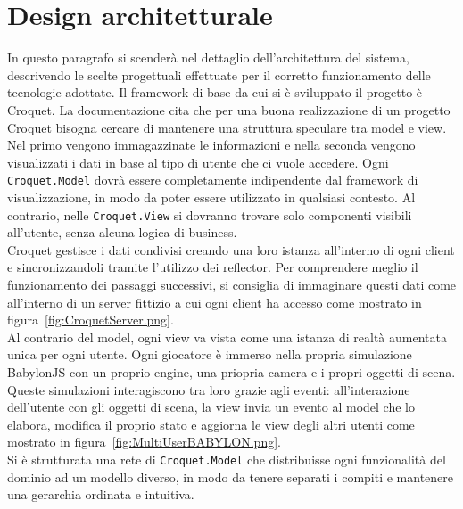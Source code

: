 \section{Design architetturale}\label{sec:design}
In questo paragrafo si scenderà nel dettaglio dell'architettura del sistema, descrivendo le scelte progettuali effettuate per il corretto funzionamento delle tecnologie adottate.
\newline
Il framework di base da cui si è sviluppato il progetto è Croquet. La documentazione cita che per una buona realizzazione di un progetto Croquet bisogna cercare di mantenere una 
struttura speculare tra model e view. Nel primo vengono immagazzinate le informazioni e nella seconda vengono visualizzati i dati in base al tipo di utente che ci vuole accedere.
Ogni \texttt{Croquet.Model} dovrà essere completamente indipendente dal framework di visualizzazione, in modo da poter essere utilizzato in qualsiasi contesto. Al contrario, nelle
\texttt{Croquet.View} si dovranno trovare solo componenti visibili all'utente, senza alcuna logica di business.\\
Croquet gestisce i dati condivisi creando una loro istanza all'interno di ogni client e sincronizzandoli tramite l'utilizzo dei reflector. Per comprendere meglio il funzionamento
dei passaggi successivi, si consiglia di immaginare questi dati come all'interno di un server fittizio a cui ogni client ha accesso come mostrato in figura~\ref{fig:CroquetServer.png}.\\
Al contrario del model, ogni view va vista come una istanza di realtà aumentata unica per ogni utente. Ogni giocatore è immerso nella propria simulazione BabylonJS con un proprio engine,
una priopria camera e i propri oggetti di scena. Queste simulazioni interagiscono tra loro grazie agli eventi: all'interazione dell'utente con gli oggetti di scena, la view invia un
evento al model che lo elabora, modifica il proprio stato e aggiorna le view degli altri utenti come mostrato in figura~\ref{fig:MultiUserBABYLON.png}.\\
Si è strutturata una rete di \texttt{Croquet.Model} che distribuisse ogni funzionalità del dominio ad un modello diverso, in modo da tenere separati i compiti e mantenere una
gerarchia ordinata e intuitiva.\\



